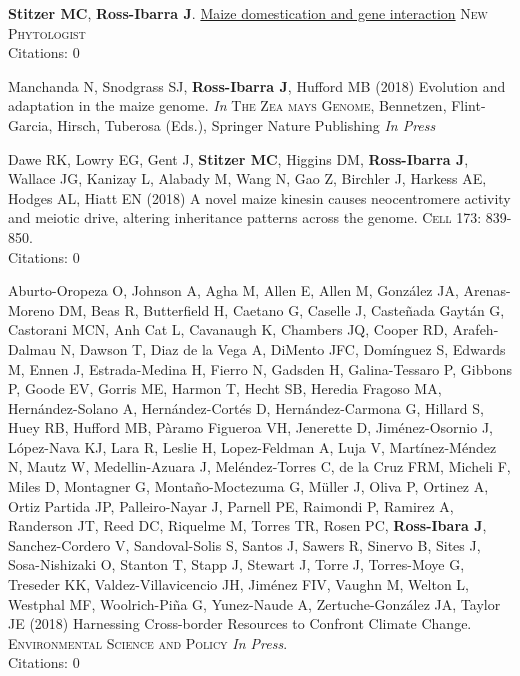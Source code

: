\documentclass[letterpaper,10pt]{article}
\begin{document}
\begin{etaremune}
\setlength\itemsep{0ex}

\item {\bf Stitzer MC}, {\bf Ross-Ibarra J}.
\href{https://peerj.com/preprints/26502/}{Maize domestication and gene interaction} \textsc{New Phytologist}
\\Citations: 0\\

\item Manchanda N, Snodgrass SJ, \textbf{Ross-Ibarra J}, Hufford MB (2018) Evolution and adaptation in the maize genome. \textit{In} \textsc{The Zea mays Genome}, Bennetzen, Flint-Garcia, Hirsch, Tuberosa (Eds.), Springer Nature Publishing \textit{In Press}

\item Dawe RK, Lowry EG, Gent J, \textbf{Stitzer MC}, Higgins DM, \textbf{Ross-Ibarra J}, Wallace JG, Kanizay L, Alabady M, Wang N, Gao Z, Birchler J, Harkess AE, Hodges AL, Hiatt EN (2018) A novel maize kinesin causes neocentromere activity and meiotic drive, altering inheritance patterns across the genome. \textsc{Cell} 173: 839-850.
\\Citations: 0\\

\item  Aburto-Oropeza O, Johnson A, Agha M, Allen E,  Allen M,  Gonz\'{a}lez JA, Arenas-Moreno DM, Beas R, Butterfield H, Caetano G, Caselle J, Caste\~{n}ada Gayt\'{a}n G, Castorani MCN, Anh Cat L, Cavanaugh K, Chambers JQ, Cooper RD, Arafeh-Dalmau N, Dawson T, Diaz de la Vega A, DiMento JFC, Dom\'{i}nguez S, Edwards M, Ennen J, Estrada-Medina H, Fierro N, Gadsden H, Galina-Tessaro P, Gibbons P, Goode EV, Gorris ME, Harmon T, Hecht SB, Heredia Fragoso MA, Hern\'{a}ndez-Solano A, Hern\'{a}ndez-Cort\'{e}s D, Hern\'{a}ndez-Carmona G, Hillard S, Huey RB, Hufford MB, P\`{a}ramo Figueroa VH, Jenerette D, Jim\'{e}nez-Osornio J, L\'{o}pez-Nava KJ, Lara R, Leslie H, Lopez-Feldman A, Luja V, Mart\'{i}nez-M\'{e}ndez N, Mautz W, Medellin-Azuara J, Mel\'{e}ndez-Torres C, de la Cruz FRM,  Micheli F, Miles D, Montagner G, Monta\~{n}o-Moctezuma G, M\"{u}ller J, Oliva P, Ortinez A, Ortiz Partida JP, Palleiro-Nayar J, Parnell PE, Raimondi P, Ramirez A, Randerson JT, Reed DC, Riquelme M, Torres TR, Rosen PC, {\bf Ross-Ibara J}, Sanchez-Cordero V, Sandoval-Solis S, Santos J, Sawers R, Sinervo B, Sites J,  Sosa-Nishizaki O, Stanton T, Stapp J, Stewart J, Torre J,  Torres-Moye G, Treseder KK, Valdez-Villavicencio JH, Jim\'{e}nez FIV, Vaughn M, Welton L, Westphal MF, Woolrich-Pi\~{n}a G,  Yunez-Naude A, Zertuche-Gonz\'{a}lez JA, Taylor JE (2018)
Harnessing Cross-border Resources to Confront Climate Change.  \textsc{Environmental Science and Policy} \textit{In Press}.
\\Citations: 0\\


\end{etaremune}
\end{document}

